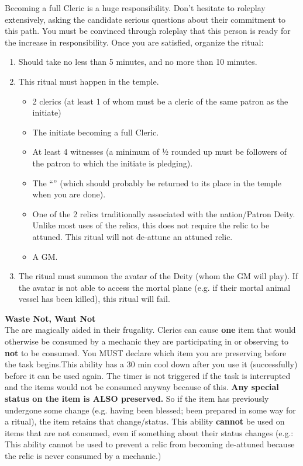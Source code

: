 \documentclass[green]{GL2020}
\begin{document}
Becoming a full Cleric is a huge responsibility. Don’t hesitate to roleplay extensively, asking the candidate serious questions about their commitment to this path. You must be convinced through roleplay that this person is ready for the increase in responsibility. Once you are satisfied, organize the ritual:
  \begin{enumerate}
    \item Should take no less than 5 minutes, and no more than 10 minutes.
    \item This ritual must happen in the temple.
    \begin{itemize}
      \item 2 clerics (at least 1 of whom must be a cleric of the same patron as the initiate)
      \item The initiate becoming a full Cleric.
      \item At least 4 witnesses (a minimum of ½ rounded up must be followers of the patron to which the initiate is pledging).
      \item The ``\iOakStaff{}'' (which should probably be returned to its place in the temple when you are done).
      \item One of the 2 relics traditionally associated with the nation/Patron Deity.  Unlike most uses of the relics, this does not require the relic to be attuned. This ritual will not de-attune an attuned relic.
      \item A GM.
    \end{itemize}
    \item The ritual must summon the avatar of the Deity (whom the GM will play). If the avatar is not able to access the mortal plane (e.g. if their mortal animal vessel has been killed), this ritual will fail. 
  \end{enumerate}
   
\textbf{Waste Not, Want Not}\\
 The \pShip{} are magically aided in their frugality. Clerics can cause \textbf{one} item that would otherwise be consumed by a mechanic they are participating in or observing to \textbf{not} to be consumed. You MUST declare which item you are preserving before the task begins.This ability has a 30 min cool down after you use it (successfully) before it can be used again. The timer is not triggered if the task is interrupted and the items would not be consumed anyway because of this. \textbf{Any special status on the item is ALSO preserved.} So if the item has previously undergone some change (e.g. having been blessed; been prepared in some way for a ritual), the item retains that change/status. This ability \textbf{cannot} be used on items that are not consumed, even if something about their status changes (e.g.: This ability cannot be used to prevent a relic from becoming de-attuned because the relic is never consumed by a mechanic.)
\end{document}
